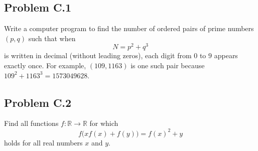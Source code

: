 \documentclass[12pt]{article}
\newcommand{\xmark}{\textcolor{color6}{\ding{55}}}   %
\begin{document}
    \subsection{Problem C.1 \xmark}
      \begin{tcolorbox}[problembox]
         Write a computer program to find the number of ordered pairs of prime numbers $(p,q)$ such that when
          \[
            N = p^2 + q^3
          \]
          is written in decimal (without leading zeros), each digit from $0$ to $9$ appears exactly once. For example, $(109,1163)$ is one
          such pair because $109^2 + 1163^3 = 1573049628$.
     \end{tcolorbox}
%
%
%
%

    \clearpage

    \subsection{Problem C.2 \xmark}
      \begin{tcolorbox}[problembox]
         Find all functions $f:\mathbb{R}\to\mathbb{R}$ for which
          \[
            f\big(xf(x)+f(y)\big)=f(x)^2+y
          \]
          holds for all real numbers $x$ and $y$.
      \end{tcolorbox}
\end{document}
